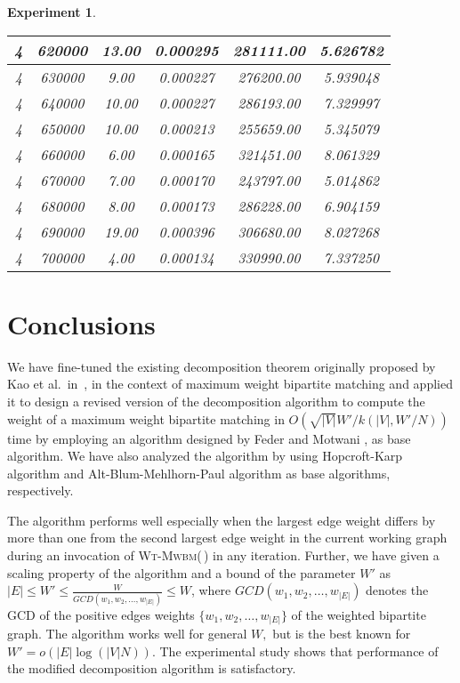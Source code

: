 \documentclass[runningheads,a4paper]{llncs}
\newtheorem{experiment}{Experiment}
\begin{document}
\begin{experiment}
\begin{table}[htpb]
{\begin{tabular}{|c|c|c|c|c|c|}
4 & 620000 & 13.00 & 0.000295 & 281111.00 & 5.626782 \\ \hline
4 & 630000 & 9.00  & 0.000227 & 276200.00 & 5.939048 \\ \hline
4 & 640000 & 10.00 & 0.000227 & 286193.00 & 7.329997 \\ \hline
4 & 650000 & 10.00 & 0.000213 & 255659.00 & 5.345079 \\ \hline
4 & 660000 & 6.00  & 0.000165 & 321451.00 & 8.061329 \\ \hline
4 & 670000 & 7.00  & 0.000170 & 243797.00 & 5.014862 \\ \hline
4 & 680000 & 8.00  & 0.000173 & 286228.00 & 6.904159 \\ \hline
4 & 690000 & 19.00 & 0.000396 & 306680.00 & 8.027268 \\ \hline
4 & 700000 & 4.00  & 0.000134 & 330990.00 & 7.337250 \\ \hline
\end{tabular}
}
\end{table}
\end{experiment}
\break
\section{Conclusions} 
\label{mwbm:Conclusion}
We have fine-tuned the existing decomposition theorem
originally proposed by Kao et al.\ in~\cite{kao02}, in
the context of maximum weight bipartite matching and applied it
 to design a revised version of the decomposition algorithm
to compute the weight of a maximum weight
bipartite matching in $\textit{O}(\sqrt{|V|}W'/k(|V|,W'/{N}))$ time by
employing an algorithm designed by Feder and Motwani \cite{feder95}, as
base algorithm. We have also analyzed the algorithm by using Hopcroft-Karp algorithm \cite{hopcroft73} and Alt-Blum-Mehlhorn-Paul algorithm \cite{alt91} as
base algorithms, respectively.


The algorithm performs well especially when the largest edge weight differs  by
more than one from the second largest edge weight in the current working graph
during an invocation of \textsc{Wt-Mwbm}(\,) in any iteration.
Further, we have given a scaling property of the algorithm and a bound of the parameter $W'$ as $|E| \leq W' \leq \frac{W}{ \textit{GCD}(w_1,w_2,\ldots,w_{|E|})} \leq W$, where $\textit{GCD}(w_1,w_2,\ldots,w_{|E|})$ denotes the GCD of the positive edges weights $\{w_1,w_2,\ldots,w_{|E|}\}$ of the weighted bipartite graph. The algorithm works well for
general $W,$ but is the best known for $W'=o(|E| \log(|V|N))$.
The experimental study shows that performance of the modified decomposition algorithm is satisfactory.
\end{document}
